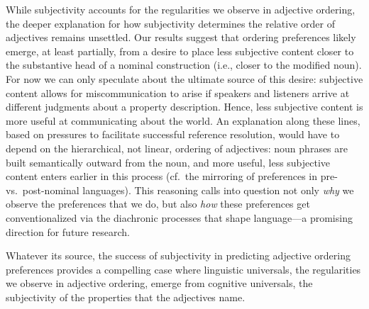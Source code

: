 \documentclass[12pt]{article}
\begin{document}
While subjectivity accounts for the regularities we observe in adjective ordering, the deeper explanation for how subjectivity determines the relative order of adjectives remains unsettled. Our results suggest that ordering preferences likely emerge, at least partially, from a desire to place less subjective content closer to the substantive head of a nominal construction (i.e., closer to the modified noun). 
For now we can only speculate about the ultimate source of this desire: subjective content allows for miscommunication to arise if speakers and listeners arrive at different judgments about a property description. Hence, less subjective content is more useful at communicating about the world. 
An explanation along these lines, based on pressures to facilitate successful reference resolution, would have to depend on the hierarchical, not linear, ordering of adjectives: noun phrases are built semantically outward from the noun, and more useful, less subjective content enters earlier in this process (cf.~the mirroring of preferences in pre- vs.~post-nominal languages). This reasoning calls into question not only \emph{why} we observe the preferences that we do, but also \emph{how} these preferences get conventionalized via the diachronic processes that shape language---a promising direction for future research. 

Whatever its source, the success of subjectivity in predicting adjective ordering preferences provides a compelling case where linguistic universals, the regularities we observe in adjective ordering, emerge from cognitive universals, the subjectivity of the properties that the adjectives name.





   
  
\end{document}
